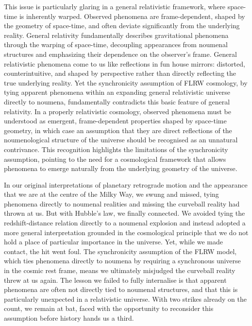 \documentclass[aps,rmp,groupedaddress,twocolumn,10pt]{revtex4-2}
\begin{document}
This issue is particularly glaring in a general relativistic framework, where space-time is inherently warped. Observed phenomena are frame-dependent, shaped by the geometry of space-time, and often deviate significantly from the underlying reality. General relativity fundamentally describes gravitational phenomena through the warping of space-time, decoupling appearances from noumenal structures and emphasizing their dependence on the observer's frame. General relativistic phenomena come to us like reflections in fun house mirrors: distorted, counterintuitive, and shaped by perspective rather than directly reflecting the true underlying reality. Yet the synchronicity assumption of FLRW cosmology, by tying apparent phenomena within an expanding general relativistic universe directly to noumena, fundamentally contradicts this basic feature of general relativity. In a properly relativistic cosmology, observed phenomena must be understood as emergent, frame-dependent properties shaped by space-time geometry, in which case an assumption that they are direct reflections of the noumenological structure of the universe should be recognised as an unnatural contrivance. This recognition highlights the limitations of the synchronicity assumption, pointing to the need for a cosmological framework that allows phenomena to emerge naturally from the underlying geometry of the universe.

In our original interpretations of planetary retrograde motion and the appearance that we are at the centre of the Milky Way, we swung and missed, tying phenomena directly to noumenal realities and missing the curveball reality had thrown at us. But with Hubble's law, we finally connected. We avoided tying the redshift-distance relation directly to a noumenal explosion and instead adopted a more general interpretation grounded in the cosmological principle that we do not hold a place of particular importance in the universe. Yet, while we made contact, the hit went foul. The synchronicity assumption of the FLRW model, which ties phenomena directly to noumena by requiring a synchronous universe in the cosmic rest frame, means we ultimately misjudged the curveball reality threw at us again. The lesson we failed to fully internalise is that apparent phenomena are often not directly tied to noumenal structures, and that this is particularly unexpected in a relativistic universe. With two strikes already on the count, we remain at bat, faced with the opportunity to reconsider this assumption before history hands us a third.
\end{document}
